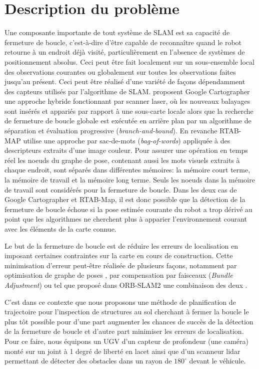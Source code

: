 \section{Description du problème} \label{sec:ugv_problem_description}
Une composante importante de tout système de SLAM est sa capacité de fermeture de boucle, c'est-à-dire d'être capable de reconnaître quand le robot retourne à un endroit déjà visité, particulièrement en l'absence de systèmes de positionnement absolus. Ceci peut être fait localement sur un sous-ensemble local des observations courantes ou globalement sur toutes les observations faites jusqu'au présent. Ceci peut être réalisé d'une variété de façons dépendamment des capteurs utilisés par l'algorithme de SLAM. \citep{Hess2016} proposent Google Cartographer une approche hybride fonctionnant par scanner laser, où les nouveaux balayages sont insérés et appariés par rapport à une sous-carte locale alors que la recherche de fermeture de boucle globale est exécutée en arrière plan par un algorithme de séparation et évaluation progressive (\textit{branch-and-bound}). En revanche RTAB-MAP \citep{Labbe2014} utilise une approche par sac-de-mots (\textit{bag-of-words}) appliquée à des descripteurs extraits d'une image couleur. Pour assurer une opération en temps réel les noeuds du graphe de pose, contenant aussi les mots visuels extraits à chaque endroit, sont séparés dans différentes mémoires: la mémoire court terme, la mémoire de travail et la mémoire long terme. Seuls les noeuds dans la mémoire de travail sont considérés pour la fermeture de boucle. Dans les deux cas de Google Cartographer et RTAB-Map, il est donc possible que la détection de la fermeture de boucle échoue si la pose estimée courante du robot a trop dérivé au point que les algorithmes ne cherchent plus à apparier l'environnement courant avec les éléments de la carte connue.

Le but de la fermeture de boucle est de réduire les erreurs de localisation en imposant certaines contraintes sur la carte en cours de construction. Cette minimisation d'erreur peut-être réalisée de plusieurs façons, notamment par optimisation de graphe de poses \citep{Carlone2016}, par compensation par faisceaux (\textit{Bundle Adjustment}) \citep{Mei2011} ou tel que proposé dans ORB-SLAM2 une combinaison des deux \citep{Mur-Artal2017}.

C'est dans ce contexte que nous proposons une méthode de planification de trajectoire pour l'inspection de structures au sol cherchant à fermer la boucle le plus tôt possible pour d'une part augmenter les chances de succès de la détection de la fermeture de boucle et d'autre part minimiser les erreurs de localisation. Pour ce faire, nous équipons un UGV d'un capteur de profondeur (une caméra) monté sur un joint à 1 degré de liberté en lacet ainsi que d'un scanneur lidar permettant de détecter des obstacles dans un rayon de $180^\circ$ devant le véhicule.


